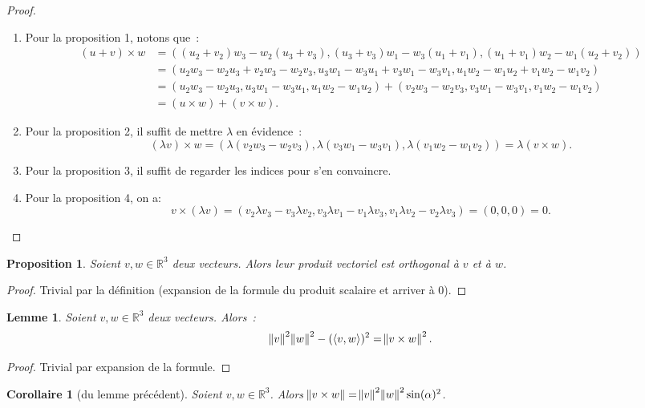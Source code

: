 \documentclass{article}
\newcommand{\R}{\mathbb R}
\newcommand{\scpr}[2]{\left\langle #1, #2\right\rangle}
\newtheorem{prp}[thm]{Proposition}
\newtheorem{cor}[thm]{Corollaire}
\newtheorem{lem}[thm]{Lemme}
\theoremstyle{definition}
\theoremstyle{remark}
\begin{document}
		\begin{proof}~
		\begin{enumerate}
			\item Pour la proposition 1, notons que~:
			      \begin{align*}(u+v) \times w &= ((u_2+v_2)w_3 - w_2(u_3+v_3), (u_3+v_3)w_1 - w_3(u_1+v_1), (u_1+v_1)w_2 - w_1(u_2+v_2)) \\
			      	&= (u_2w_3-w_2u_3 + v_2w_3-w_2v_3, u_3w_1-w_3u_1 + v_3w_1-w_3v_1, u_1w_2-w_1u_2 + v_1w_2-w_1v_2) \\
			      	&= (u_2w_3-w_2u_3, u_3w_1-w_3u_1, u_1w_2-w_1u_2) + (v_2w_3-w_2v_3, v_3w_1-w_3v_1, v_1w_2-w_1v_2) \\
			      	&= (u \times w) + (v \times w).
			      \end{align*}
			\item Pour la proposition 2, il suffit de mettre $\lambda$ en évidence~:
			      \[(\lambda v) \times w = (\lambda(v_2w_3-w_2v_3), \lambda(v_3w_1-w_3v_1), \lambda(v_1w_2-w_1v_2)) = \lambda(v \times w).\]
			\item Pour la proposition 3, il suffit de regarder les indices pour s'en convaincre.
			\item Pour la proposition 4, on a:
			      \[v \times (\lambda v) = (v_2\lambda v_3-v_3\lambda v_2, v_3\lambda v_1-v_1\lambda v_3, v_1\lambda v_2-v_2\lambda v_3) = (0, 0, 0) = 0.\]
		\end{enumerate}
		\end{proof}

		\begin{prp} Soient $v, w \in \R^3$ deux vecteurs. Alors leur produit vectoriel est orthogonal à $v$ et à $w$. \end{prp}

		\begin{proof} Trivial par la définition (expansion de la formule du produit scalaire et arriver à 0). \end{proof}

		\begin{lem}\label{prodsVecSc} Soient $v, w \in \R^3$ deux vecteurs. Alors~:\[\norm v^2\norm w^2 - (\scpr vw)^2 = \norm{v \times w}^2.\] \end{lem}

		\begin{proof} Trivial par expansion de la formule. \end{proof}

		\begin{cor}[du lemme précédent] Soient $v, w \in \R^3$. Alors $\norm {v \times w} = \norm v^2\norm w^2\sin(\alpha)^2$. \end{cor}
\end{document}

